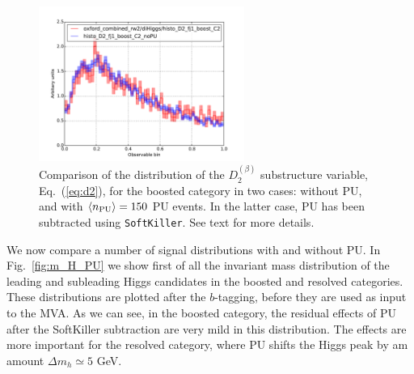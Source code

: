\begin{figure}[t]
  \begin{center}
      \vspace{-1cm}
  \includegraphics[width=0.60\textwidth]{plots/pu-vs-nopu-comparison-d2.pdf}
  \caption{\small
    Comparison of the distribution of the $D_2^{(\beta)}$
    substructure variable, Eq.~(\ref{eq:d2}), for the
    boosted category in two cases: without PU, and
    with $\left\langle n_{\rm PU}\right\rangle=150$ PU events.
    In the latter case, PU has been subtracted using
    {\tt SoftKiller}.
    See text for more details.
}
\label{fig:pu-vs-nopu-comparison-d2}
\end{center}
\end{figure}


We now compare a number of signal distributions with
and without PU.
%
In Fig.~\ref{fig:m_H_PU} we show first of all the invariant mass distribution
of the leading and subleading Higgs candidates in the boosted
and resolved categories.
%
These distributions are plotted after the $b$-tagging,
before they are used as input to the MVA.
%
As we can see, in the boosted category, the residual effects of PU
after the SoftKiller subtraction are very mild in this
distribution.
%
The effects are more important for the resolved category, where PU
shifts the Higgs peak by am amount $\Delta m_h \simeq 5$ GeV.

